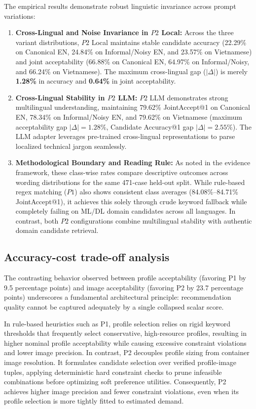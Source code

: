 

The empirical results demonstrate robust linguistic invariance across prompt variations:
\begin{enumerate}
    \item \textbf{Cross-Lingual and Noise Invariance in $P2$ Local:} Across the three variant distributions, $P2$ Local maintains stable candidate accuracy (22.29\% on Canonical EN, 24.84\% on Informal/Noisy EN, and 23.57\% on Vietnamese) and joint acceptability (66.88\% on Canonical EN, 64.97\% on Informal/Noisy, and 66.24\% on Vietnamese). The maximum cross-lingual gap ($|\Delta|$) is merely \textbf{1.28\%} in accuracy and \textbf{0.64\%} in joint acceptability.
    \item \textbf{Cross-Lingual Stability in $P2$ LLM:} $P2$ LLM demonstrates strong multilingual understanding, maintaining 79.62\% JointAccept@1 on Canonical EN, 78.34\% on Informal/Noisy EN, and 79.62\% on Vietnamese (maximum acceptability gap $|\Delta| = 1.28\%$, Candidate Accuracy@1 gap $|\Delta| = 2.55\%$). The LLM adapter leverages pre-trained cross-lingual representations to parse localized technical jargon seamlessly.
    \item \textbf{Methodological Boundary and Reading Rule:} As noted in the evidence framework, these class-wise rates compare descriptive outcomes across wording distributions for the same 471-case held-out split. While rule-based regex matching ($P1$) also shows consistent class averages (84.08\%--84.71\% JointAccept@1), it achieves this solely through crude keyword fallback while completely failing on ML/DL domain candidates across all languages. In contrast, both $P2$ configurations combine multilingual stability with authentic domain candidate retrieval.
\end{enumerate}

\subsection{Accuracy-cost trade-off analysis}
\label{subsec:cross_metric_analysis}

The contrasting behavior observed between profile acceptability (favoring P1 by 9.5 percentage points) and image acceptability (favoring P2 by 23.7 percentage points) underscores a fundamental architectural principle: recommendation quality cannot be captured adequately by a single collapsed scalar score.

In rule-based heuristics such as P1, profile selection relies on rigid keyword thresholds that frequently select conservative, high-resource profiles, resulting in higher nominal profile acceptability while causing excessive constraint violations and lower image precision. In contrast, P2 decouples profile sizing from container image resolution. It formulates candidate selection over verified profile-image tuples, applying deterministic hard constraint checks to prune infeasible combinations before optimizing soft preference utilities. Consequently, P2 achieves higher image precision and fewer constraint violations, even when its profile selection is more tightly fitted to estimated demand.

